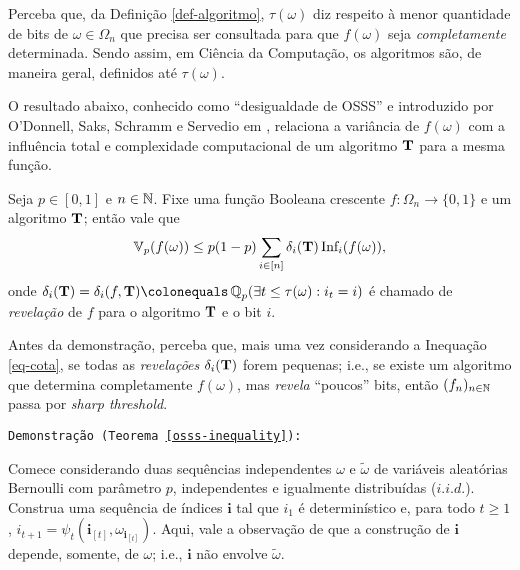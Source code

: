 \par Perceba que, da Definição \ref{def-algoritmo}, $\tau(\omega)$ diz respeito à menor quantidade de bits de $\omega \in \Omega_n$ que precisa ser consultada para que $f(\omega)$ seja \textit{completamente} determinada. Sendo assim, em Ciência da Computação, os algoritmos são, de maneira geral, definidos até $\tau(\omega)$.

\par O resultado abaixo, conhecido como ``desigualdade de OSSS'' e introduzido por O'Donnell, Saks, Schramm e Servedio em \cite{o2005every}, relaciona a variância de $f(\omega)$ com a influência total e complexidade computacional de um algoritmo $\text{\textbf{T}}$ para a mesma função.\vspace{-3pt}

\begin{mythm}\label{osss-inequality}
	Seja $p \in [0,1]$ e $n \in \operatorname{\mathbb{N}}$. Fixe uma função Booleana crescente $f: \Omega_n \longrightarrow \{0,1\}$ e um algoritmo $\text{\textbf{T}}$; então vale que
	\begin{align*}
		\operatorname{\mathbb{V}}_p(f(\omega)) \leq p(1 - p) \sum_{i \in [n]} \delta_i(\text{\textbf{T}}) \, \text{Inf}_i(f(\omega)), 
	\end{align*}
	onde $\delta_i(\text{\textbf{T}}) = \delta_i(f, \text{\textbf{T}}) \colonequals \QX_p(\exists t \leq \tau(\omega) : i_t = i)$ é chamado de \textit{revelação} de $f$ para o algoritmo $\text{\textbf{T}}$ e o bit $i$.
\end{mythm}

\par Antes da demonstração, perceba que, mais uma vez considerando a Inequação \ref{eq-cota}, se todas as \textit{revelações} $\delta_i(\text{\textbf{T}})$ forem pequenas; i.e., se existe um algoritmo que determina completamente $f(\omega)$, mas \textit{revela} ``poucos'' bits, então $(f_n)_{n \in \operatorname{\mathbb{N}}}$ passa por \textit{sharp threshold}.

\par \texttt{Demonstração (Teorema \ref{osss-inequality}):}

\par Comece considerando duas sequências independentes $\omega$ e $\tilde{\omega}$ de variáveis aleatórias Bernoulli com parâmetro $p$, independentes e igualmente distribuídas ($i.i.d.$). Construa uma sequência de índices $\mathbf{i}$ tal que $i_1$ é determinístico e, para todo $t \geq 1$, $i_{t+1} = \psi_t(\mathbf{i}_{[t]}, \omega_{\mathbf{i}_{[t]}})$. Aqui, vale a observação de que a construção de $\mathbf{i}$ depende, somente, de $\omega$; i.e., $\mathbf{i}$ não envolve $\tilde{\omega}$.

